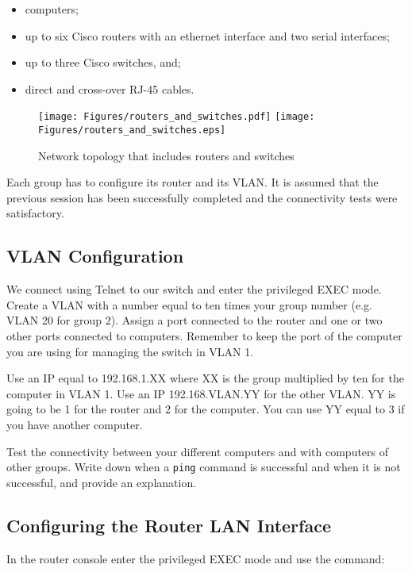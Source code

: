 \begin{itemize}
\item computers;
\item up to six Cisco routers with an ethernet interface and two serial interfaces;
\item up to three Cisco switches, and;
\item direct and cross-over RJ-45 cables.
\end{itemize}

\begin{figure}
\centering
\ifpdf
\texttt{[image: Figures/routers\_and\_switches.pdf]}
\else
\texttt{[image: Figures/routers\_and\_switches.eps]}
\fi
\caption{Network topology that includes routers and switches}
\label{fig:routers_and_switches}
\end{figure}

Each group has to configure its router and its VLAN. It is assumed that the previous session has been successfully completed and the connectivity tests were satisfactory.

\subsection{VLAN Configuration}

We connect using Telnet to our switch and enter the privileged EXEC mode. Create a VLAN with a number equal to ten times your group number (e.g. VLAN 20 for group 2). Assign a port connected to the router and one or two other ports connected to computers. Remember to keep the port of the computer you are using for managing the switch in VLAN 1.

Use an IP equal to 192.168.1.XX where XX is the group multiplied by ten for the computer in VLAN 1. Use an IP 192.168.VLAN.YY for the other VLAN. YY is going to be 1 for the router and 2 for the computer. You can use YY equal to 3 if you have another computer.

Test the connectivity between your different computers and with computers of other groups. Write down when a \texttt{\color{blue}ping} command is successful and when it is not successful, and provide an explanation.

\subsection{Configuring the Router LAN Interface}

In the router console enter the privileged EXEC mode and use the command:

